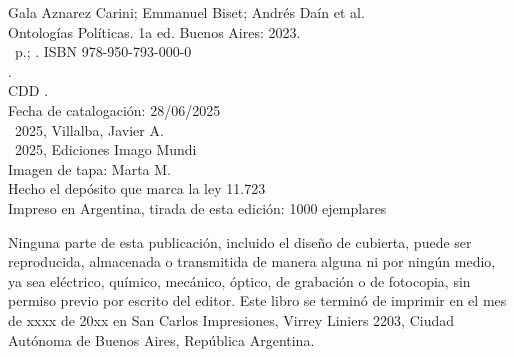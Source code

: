 \noindent Gala Aznarez Carini; Emmanuel Biset; Andrés Daín et al. \\
\noindent Ontologías Políticas. 1a ed. Buenos Aires: 2023.\\
\noindent \ztotpages\ p.; \valorEspecifico. ISBN 978-950-793-000-0 \\
. \\
\noindent CDD .\\
\noindent Fecha de catalogación: 28/06/2025 \\
\noindent \textcopyright~2025, Villalba, Javier A. \\
\noindent \textcopyright~2025, Ediciones Imago Mundi\\
\noindent Imagen de tapa: Marta M.\\
\noindent Hecho el depósito que marca la ley 11.723\\
\noindent Impreso en Argentina, tirada de esta edición: 1000 ejemplares\\

\vfill

\noindent {}\bigskip

\noindent Ninguna parte de esta publicación, incluido el diseño de cubierta, puede ser reproducida, almacenada o transmitida de manera alguna ni por ningún medio, ya sea eléctrico, químico, mecánico, óptico, de grabación o de fotocopia, sin permiso previo por escrito del editor. Este libro se terminó de imprimir en el mes de xxxx de 20xx en San Carlos Impresiones, Virrey Liniers 2203, Ciudad Autónoma de Buenos Aires, República Argentina.
